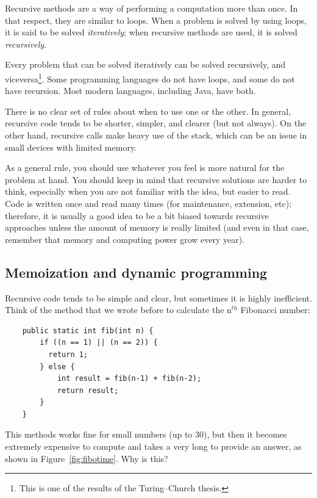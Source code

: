Recursive methods are a way of performing a computation more than
once. In that respect, they are similar to loops. When a problem is
solved by using loops, it is said to be solved \emph{iteratively};
when recursive methods are used, it is solved \emph{recursively}. 

Every problem that can be solved iteratively can be solved
recursively, and viceversa\footnote{This is one of the results of the
 Turing--Church thesis.}. Some programming languages do not have
loops, and some do not have recursion. Most modern languages,
including Java, have both. 

There is no clear set of rules about when to use one or the other. In
general, recursive code tends to be shorter, simpler, and clearer (but
not always). On the other hand, recursive calls make heavy use of the
stack, which can be an issue in small devices with limited memory. 

As a general rule, you should use whatever you feel is more natural
for the problem at hand. You should keep in mind that recursive
solutions are harder to think, especially when you are not familiar
with the idea, but easier to read. Code is written once and read many
times (for maintenance, extension, etc); therefore, it is usually a good
idea to be a bit biased towards recursive approaches unless the amount
of memory is really limited (and even in that case, remember that
memory and computing power grow every year). 

\subsection{Memoization and dynamic programming}
\label{sec:memo-dynam-progr}

Recursive code tends to be simple and clear, but sometimes it is
highly inefficient. Think of the method that we wrote before to
calculate the n$^{th}$ Fibonacci number: 

\begin{verbatim}
    public static int fib(int n) {
        if ((n == 1) || (n == 2)) {
          return 1; 
        } else {
            int result = fib(n-1) + fib(n-2);
            return result;
        }
    }
\end{verbatim}

This methods works fine for small numbers (up to 30), but then it
becomes extremely expensive to compute and takes a very long to
provide an answer, as shown in Figure~\ref{fig:fibotime}. Why is this? 

